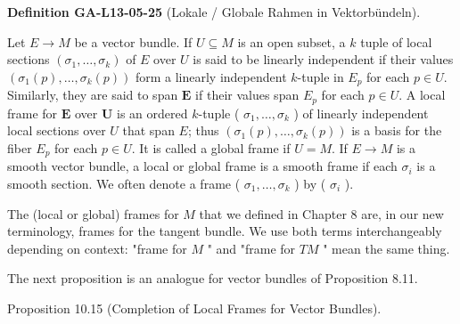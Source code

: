 \documentclass[10pt, letterpaper]{article}
\newcommand{\CustomHeading}[3]{%
  \par\medskip\noindent%
  \textbf{#1 #2} \textnormal{(#3)}.\enskip%
}
\newenvironment{DEF}[2]{\begin{unitbox}\CustomHeading{Definition}{#1}{#2}}{\end{unitbox}}
\begin{document}
\begin{DEF}{GA-L13-05-25}{Lokale / Globale Rahmen in Vektorbündeln}
Let $E \rightarrow M$ be a vector bundle. If $U \subseteq M$ is an open subset, a $k$ tuple of local sections $\left(\sigma_{1}, \ldots, \sigma_{k}\right)$ of $E$ over $U$ is said to be linearly independent if their values $\left(\sigma_{1}(p), \ldots, \sigma_{k}(p)\right)$ form a linearly independent $k$-tuple in $E_{p}$ for each $p \in U$. Similarly, they are said to span $\boldsymbol{E}$ if their values span $E_{p}$ for each $p \in U$. A local frame for $\boldsymbol{E}$ over $\boldsymbol{U}$ is an ordered $k$-tuple ( $\sigma_{1}, \ldots, \sigma_{k}$ ) of linearly independent local sections over $U$ that span $E$; thus $\left(\sigma_{1}(p), \ldots, \sigma_{k}(p)\right)$ is a basis for the fiber $E_{p}$ for each $p \in U$. It is called a global frame if $U=M$. If $E \rightarrow M$ is a smooth vector bundle, a local or global frame is a smooth frame if each $\sigma_{i}$ is a smooth section. We often denote a frame ( $\sigma_{1}, \ldots, \sigma_{k}$ ) by ( $\sigma_{i}$ ).
\end{DEF}

The (local or global) frames for $M$ that we defined in Chapter 8 are, in our new terminology, frames for the tangent bundle. We use both terms interchangeably depending on context: "frame for $M$ " and "frame for $T M$ " mean the same thing.

The next proposition is an analogue for vector bundles of Proposition 8.11.

Proposition 10.15 (Completion of Local Frames for Vector Bundles). 
\end{document}
